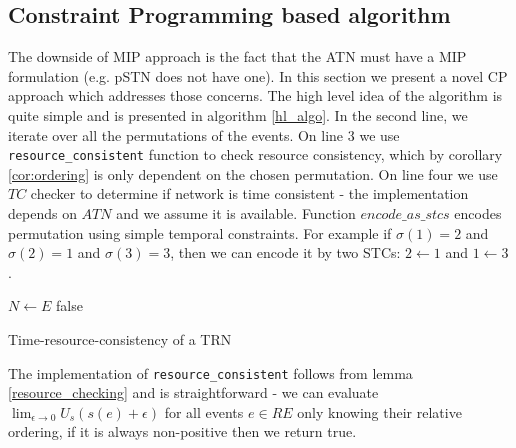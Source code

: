 \subsection{Constraint Programming based algorithm}
The downside of MIP approach is the fact that the ATN must have a MIP formulation (e.g. pSTN does not have one). In this section we present a novel CP approach which addresses those concerns. The high level idea of the algorithm is quite simple and is presented in algorithm \ref{hl_algo}. In the second line, we iterate over all the permutations of the events. On line 3 we use \texttt{resource\_consistent} function to check resource consistency, which by corollary \ref{cor:ordering} is only dependent on the chosen permutation. On line four we use $TC$ checker to determine if network is time consistent - the implementation depends on $ATN$ and we assume it is available. Function $encode\_as\_stcs$ encodes permutation using simple temporal constraints. For example if $\sigma(1) = 2$ and $\sigma(2) = 1$ and $\sigma(3) = 3$, then we can encode it by two STCs: $ 2 \leftarrow 1 $ and $1 \leftarrow 3$.

\begin{algorithm}[h]
    \label{hl_algo}
    $N \leftarrow E$\;
    \Return false\;
    \caption{Time-resource-consistency of a TRN }
\end{algorithm}

\vspace{-3mm}

The implementation of \texttt{resource\_consistent} follows from lemma \ref{resource_checking} and is straightforward - we can evaluate $\lim_{\epsilon \to 0} U_s(s(e) + \epsilon)$ for all events $e \in RE$ only knowing their relative ordering, if it is always non-positive then we return true.

